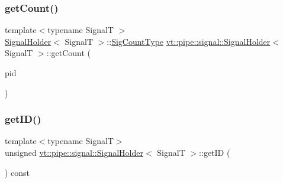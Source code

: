 \subsubsection{\texorpdfstring{get\+Count()}{getCount()}}
{\footnotesize\ttfamily template$<$typename SignalT $>$ \\
\hyperlink{structvt_1_1pipe_1_1signal_1_1_signal_holder}{Signal\+Holder}$<$ SignalT $>$\+::\hyperlink{structvt_1_1pipe_1_1signal_1_1_signal_holder_aced54515f402b63f6dea174e5b027c81}{Sig\+Count\+Type} \hyperlink{structvt_1_1pipe_1_1signal_1_1_signal_holder}{vt\+::pipe\+::signal\+::\+Signal\+Holder}$<$ SignalT $>$\+::get\+Count (\begin{DoxyParamCaption}\item[{\hyperlink{namespacevt_ac9852acda74d1896f48f406cd72c7bd3}{Pipe\+Type} const \&}]{pid }\end{DoxyParamCaption})}

\mbox{\label{structvt_1_1pipe_1_1signal_1_1_signal_holder_a5a7daec96f1824691dbeefd9567974b9}} 
\subsubsection{\texorpdfstring{get\+I\+D()}{getID()}}
{\footnotesize\ttfamily template$<$typename SignalT$>$ \\
unsigned \hyperlink{structvt_1_1pipe_1_1signal_1_1_signal_holder}{vt\+::pipe\+::signal\+::\+Signal\+Holder}$<$ SignalT $>$\+::get\+ID (\begin{DoxyParamCaption}{ }\end{DoxyParamCaption}) const\hspace{0.3cm}{\ttfamily [inline]}}

\mbox{\label{structvt_1_1pipe_1_1signal_1_1_signal_holder_a5be1905ef30b9c0e8764daa5f471d445}} 
